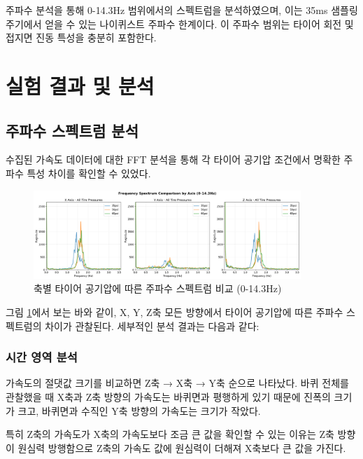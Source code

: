 \documentclass[12pt,a4paper]{article}
\begin{document}

주파수 분석을 통해 0-14.3Hz 범위에서의 스펙트럼을 분석하였으며, 이는 35ms 샘플링 주기에서 얻을 수 있는 나이퀴스트 주파수 한계이다. 이 주파수 범위는 타이어 회전 및 접지면 진동 특성을 충분히 포함한다.

\newpage
\section{실험 결과 및 분석}
\label{sec:results}

\subsection{주파수 스펙트럼 분석}
\label{subsec:frequency_results}

수집된 가속도 데이터에 대한 FFT 분석을 통해 각 타이어 공기압 조건에서 명확한 주파수 특성 차이를 확인할 수 있었다.

\begin{figure}[H]
    \centering
    \includegraphics[width=0.9\textwidth]{images/Fre11.png}
    \caption{축별 타이어 공기압에 따른 주파수 스펙트럼 비교 (0-14.3Hz)}
    \label{fig:frequency_analysis}
\end{figure}

그림 \ref{fig:frequency_analysis}에서 보는 바와 같이, X, Y, Z축 모든 방향에서 타이어 공기압에 따른 주파수 스펙트럼의 차이가 관찰된다. 세부적인 분석 결과는 다음과 같다:

\subsubsection{시간 영역 분석}
\label{subsubsec:time_domain}

가속도의 절댓값 크기를 비교하면 Z축 → X축 → Y축 순으로 나타났다. 바퀴 전체를 관찰했을 때 X축과 Z축 방향의 가속도는 바퀴면과 평행하게 있기 때문에 진폭의 크기가 크고, 바퀴면과 수직인 Y축 방향의 가속도는 크기가 작았다. 

특히 Z축의 가속도가 X축의 가속도보다 조금 큰 값을 확인할 수 있는 이유는 Z축 방향이 원심력 방행함으로 Z축의 가속도 값에 원심력이 더해져 X축보다 큰 값을 가진다.
\end{document}
